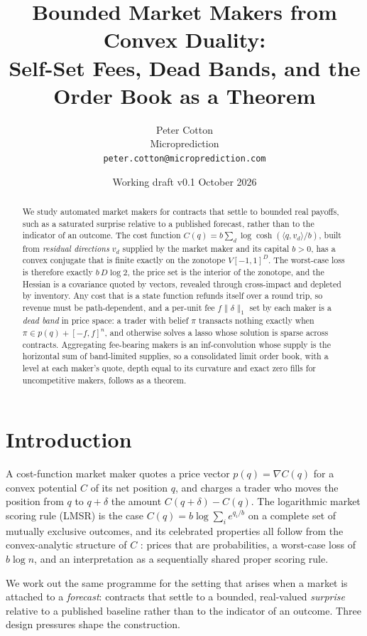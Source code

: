 \documentclass[11pt]{article}
\title{Bounded Market Makers from Convex Duality:\\
Self-Set Fees, Dead Bands, and the Order Book as a Theorem}
\author{Peter Cotton\\ Microprediction\\ \texttt{peter.cotton@microprediction.com}}
\date{Working draft v0.1 \textperiodcentered{} October 2026}
\theoremstyle{definition}
\theoremstyle{remark}
\newcommand{\ip}[2]{\langle #1,#2\rangle}
\begin{document}
\maketitle

\begin{abstract}
We study automated market makers for contracts that settle to bounded real payoffs, such as a saturated surprise
relative to a published forecast, rather than to the indicator of an outcome. The cost function
$C(q)=b\sum_{d}\log\cosh(\ip{q}{v_d}/b)$, built from \emph{residual directions} $v_d$ supplied by the market maker
and its capital $b>0$, has a convex conjugate that is finite exactly on the zonotope $V[-1,1]^{D}$. The worst-case
loss is therefore exactly $b\,D\log 2$, the price set is the interior of the zonotope, and the Hessian is a
covariance quoted by vectors, revealed through cross-impact and depleted by inventory. Any cost that is a state
function refunds itself over a round trip, so revenue must be path-dependent, and a per-unit fee $f\|\delta\|_1$
set by each maker is a \emph{dead band} in price space: a trader with belief $\pi$ transacts nothing exactly when
$\pi\in p(q)+[-f,f]^{n}$, and otherwise solves a lasso whose solution is sparse across contracts. Aggregating
fee-bearing makers is an inf-convolution whose supply is the horizontal sum of band-limited supplies, so a
consolidated limit order book, with a level at each maker's quote, depth equal to its curvature and exact zero
fills for uncompetitive makers, follows as a theorem.
\end{abstract}

\section{Introduction}

A cost-function market maker \citep{hanson2003,hanson2007,chen2007utility,abernethy2013} quotes a price vector
$p(q)=\nabla C(q)$ for a convex potential $C$ of its net position $q$, and charges a trader who moves the position
from $q$ to $q+\delta$ the amount $C(q+\delta)-C(q)$. The logarithmic market scoring rule (LMSR) is the case
$C(q)=b\log\sum_i e^{q_i/b}$ on a complete set of mutually exclusive outcomes, and its celebrated properties all follow from the
convex-analytic structure of $C$ \citep{abernethy2013}: prices that are probabilities, a worst-case loss of
$b\log n$, and an interpretation as a sequentially shared proper scoring rule.

We work out the same programme for the setting that arises when a market is attached to a \emph{forecast}:
contracts that settle to a bounded, real-valued \emph{surprise} relative to a
published baseline rather than to the indicator of an outcome. Three design pressures shape the construction.
\end{document}

